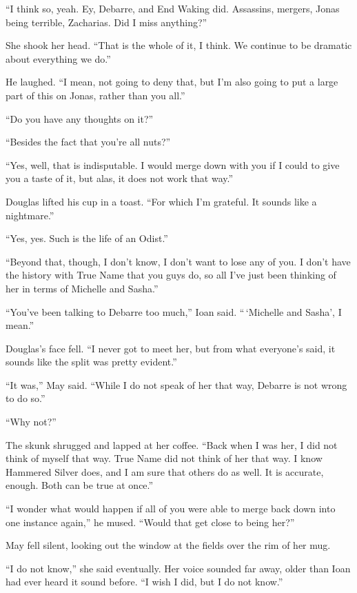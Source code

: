 ``I think so, yeah. Ey, Debarre, and End Waking did. Assassins, mergers, Jonas being terrible, Zacharias. Did I miss anything?''

She shook her head. ``That is the whole of it, I think. We continue to be dramatic about everything we do.''

He laughed. ``I mean, not going to deny that, but I'm also going to put a large part of this on Jonas, rather than you all.''

``Do you have any thoughts on it?''

``Besides the fact that you're all nuts?''

``Yes, well, that is indisputable. I would merge down with you if I could to give you a taste of it, but alas, it does not work that way.''

Douglas lifted his cup in a toast. ``For which I'm grateful. It sounds like a nightmare.''

``Yes, yes. Such is the life of an Odist.''

``Beyond that, though, I don't know, I don't want to lose any of you. I don't have the history with True Name that you guys do, so all I've just been thinking of her in terms of Michelle and Sasha.''

``You've been talking to Debarre too much,'' Ioan said. ``\,`Michelle and Sasha', I mean.''

Douglas's face fell. ``I never got to meet her, but from what everyone's said, it sounds like the split was pretty evident.''

``It was,'' May said. ``While I do not speak of her that way, Debarre is not wrong to do so.''

``Why not?''

The skunk shrugged and lapped at her coffee. ``Back when I was her, I did not think of myself that way. True Name did not think of her that way. I know Hammered Silver does, and I am sure that others do as well. It is accurate, enough. Both can be true at once.''

``I wonder what would happen if all of you were able to merge back down into one instance again,'' he mused. ``Would that get close to being her?''

May fell silent, looking out the window at the fields over the rim of her mug.

``I do not know,'' she said eventually. Her voice sounded far away, older than Ioan had ever heard it sound before. ``I wish I did, but I do not know.''
